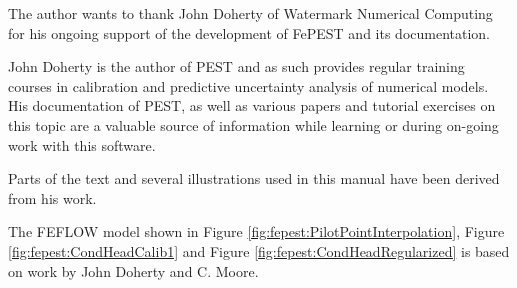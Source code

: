 The author wants to thank John Doherty of Watermark Numerical Computing for his ongoing support of the development of FePEST and its documentation.

John Doherty is the author of PEST and as such provides regular training courses in calibration and predictive uncertainty analysis of numerical models. His documentation of PEST, as well as various papers and tutorial exercises on this topic are a valuable source of information while learning or during on-going work with this software.

Parts of the text and several illustrations used in this manual have been derived from his work.

The FEFLOW model shown in Figure \ref{fig:fepest:PilotPointInterpolation}, Figure \ref{fig:fepest:CondHeadCalib1} and Figure \ref{fig:fepest:CondHeadRegularized} is based on work by John Doherty and C. Moore.
